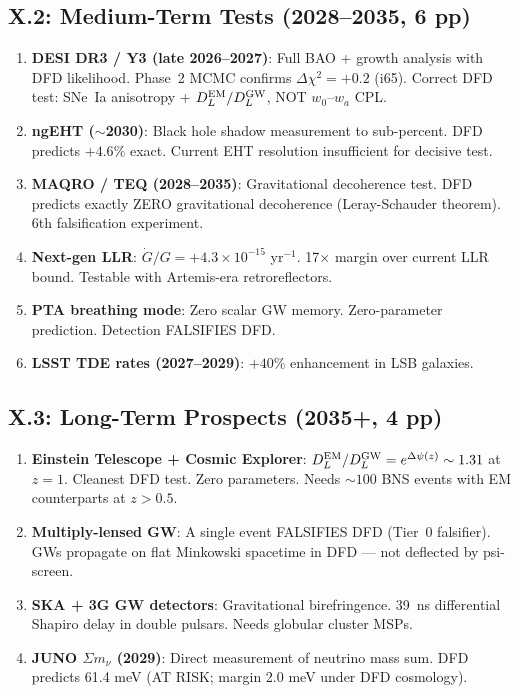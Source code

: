 \documentclass[11pt,a4paper]{article}
\begin{document}
\subsection{X.2: Medium-Term Tests (2028--2035, 6 pp)}

\begin{enumerate}
\item \textbf{DESI DR3 / Y3 (late 2026--2027)}: Full BAO + growth analysis with DFD likelihood. Phase~2 MCMC confirms $\Delta\chi^2 = +0.2$ (i65). Correct DFD test: SNe~Ia anisotropy + $D_L^{\rm EM}/D_L^{\rm GW}$, NOT $w_0$--$w_a$ CPL.

\item \textbf{ngEHT ($\sim$2030)}: Black hole shadow measurement to sub-percent. DFD predicts $+4.6\%$ exact. Current EHT resolution insufficient for decisive test.

\item \textbf{MAQRO / TEQ (2028--2035)}: Gravitational decoherence test. DFD predicts exactly ZERO gravitational decoherence (Leray-Schauder theorem). 6th falsification experiment.

\item \textbf{Next-gen LLR}: $\dot{G}/G = +4.3 \times 10^{-15}$ yr$^{-1}$. 17$\times$ margin over current LLR bound. Testable with Artemis-era retroreflectors.

\item \textbf{PTA breathing mode}: Zero scalar GW memory. Zero-parameter prediction. Detection FALSIFIES DFD.

\item \textbf{LSST TDE rates (2027--2029)}: $+40\%$ enhancement in LSB galaxies.
\end{enumerate}

\subsection{X.3: Long-Term Prospects (2035+, 4 pp)}

\begin{enumerate}
\item \textbf{Einstein Telescope + Cosmic Explorer}: $D_L^{\rm EM}/D_L^{\rm GW} = e^{\Delta\psi(z)} \sim 1.31$ at $z = 1$. Cleanest DFD test. Zero parameters. Needs $\sim 100$ BNS events with EM counterparts at $z > 0.5$.

\item \textbf{Multiply-lensed GW}: A single event FALSIFIES DFD (Tier~0 falsifier). GWs propagate on flat Minkowski spacetime in DFD --- not deflected by psi-screen.

\item \textbf{SKA + 3G GW detectors}: Gravitational birefringence. 39~ns differential Shapiro delay in double pulsars. Needs globular cluster MSPs.

\item \textbf{JUNO $\Sigma m_\nu$ (2029)}: Direct measurement of neutrino mass sum. DFD predicts 61.4 meV (AT RISK; margin 2.0 meV under DFD cosmology).
\end{enumerate}
\end{document}

